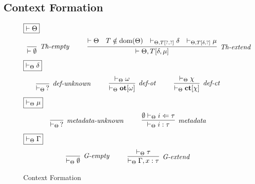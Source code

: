 \subsection{Context Formation}
\begin{figure}[h]
$\fbox{$\vdash \Theta$}$
\[
\begin{array}{c}
\infer[\textit{Th-empty}]
{\vdash \emptyset}
{ }
~~~~~~~~
\infer[\textit{Th-extend}]
{\vdash \Theta, T[\delta, \mu]}
{\vdash \Theta & T \notin \text{dom}(\Theta) & \vdash_{\Theta, T[?, ?]} \delta &
\vdash_{\Theta, T[\delta, ?]} \mu}
\end{array}
\]
$\fbox{$\vdash_\Theta \delta$}$
\[
\begin{array}{c}
\infer[\textit{def-unknown}]
{\vdash_\Theta\,?}
{ }
~~~~~~~~
\infer[\textit{def-ot}]
{\vdash_\Theta \keyw{ot}[\omega]}
{\vdash_\Theta \omega}
~~~~~~~~
\infer[\textit{def-ct}]
{\vdash_\Theta \keyw{ct}[\chi]}
{\vdash_\Theta \chi}
\end{array}
\]
$\fbox{$\vdash_\Theta \mu$}$
\[
\begin{array}{c}
\infer[\textit{metadata-unknown}]
{\vdash_\Theta\,?}
{ }
~~~~~~~~
\infer[\textit{metadata}]
{\vdash_\Theta i : \tau}
{\emptyset \vdash_\Theta i \Leftarrow \tau}
\end{array}
\]
$\fbox{$\vdash_\Theta \Gamma$}$
\[
\begin{array}{c}
\infer[\textit{G-empty}]
{\vdash_\Theta \emptyset}
{ }
~~~~~~~~
\infer[\textit{G-extend}]
{\vdash_\Theta \Gamma, x : \tau}
{\vdash_\Theta \tau}
\end{array}
\]
\caption{Context Formation}
\label{fig:context-formation}
\end{figure}


